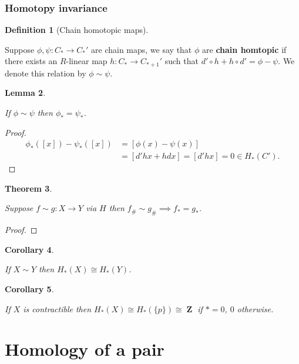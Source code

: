 \documentclass[10pt,]{book}
\newcommand{\terminology}[1]{\textbf{#1}}
\theoremstyle{plain}
\newtheorem{theorem}{Theorem}[section]
\newtheorem{corollary}[theorem]{Corollary}
\newtheorem{lemma}[theorem]{Lemma}
\theoremstyle{definition}
\newtheorem{definition}[theorem]{Definition}
\numberwithin{equation}{section}
\DeclareMathOperator{\ZZ}{\mathbf{Z}}
\begin{document}
\subsubsection[Homotopy invariance]{Homotopy invariance}\label{subsubsection-1}
\begin{definition}[Chain homotopic maps]\label{definition-11}

              Suppose \(\phi,\psi\colon C_* \to C_*'\) are chain maps, we say that \(\phi\) are \terminology{chain homtopic} if there exists an \(R\)-linear map \(h\colon C_* \to C_{*+1}'\) such that \(d'\circ h + h \circ d' = \phi - \psi\).
              We denote this relation by \(\phi \sim \psi\).
              \end{definition}
\begin{lemma}\label{lemma-4}

                If \(\phi \sim \psi\) then \(\phi_* = \psi_*\).
              \end{lemma}
\begin{proof}
\begin{align*}
\phi_*([x]) - \psi_*([x]) &= [\phi(x) - \psi(x)]\\
&= [d'hx + hdx] = [d'hx] = 0 \in H_*(C').
\end{align*}\end{proof}
\begin{theorem}\label{theorem-1}

                Suppose \(f\sim g\colon X\to Y\) via \(H\) then \(f_\# \sim g_\# \implies f_* = g_*\).
              \end{theorem}
\begin{proof}
\end{proof}
\begin{corollary}\label{corollary-2}

                If \(X\sim Y\) then \(H_*(X) \cong H_*(Y)\).
              \end{corollary}
\begin{corollary}\label{corollary-3}

                If \(X\) is contractible then \(H_*(X) \cong H_*(\{p\}) \cong \ZZ\) if \(* = 0\), \(0\) otherwise.
              \end{corollary}
\typeout{************************************************}
\typeout{************************************************}
\section[Homology of a pair]{Homology of a pair}\label{section-4}
\typeout{************************************************}
\typeout{************************************************}
\end{document}

